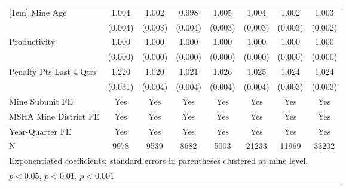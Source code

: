 {\begin{tabular}{l*{7}{c}}
[1em]
Mine Age                 &       1.004         &       1.002         &       0.998         &       1.005         &       1.004         &       1.002         &       1.003         \\
                         &     (0.004)         &     (0.003)         &     (0.004)         &     (0.003)         &     (0.003)         &     (0.003)         &     (0.002)         \\
[1em]
Productivity             &       1.000\sym{*}  &       1.000\sym{**} &       1.000\sym{*}  &       1.000\sym{*}  &       1.000\sym{***}&       1.000\sym{**} &       1.000\sym{***}\\
                         &     (0.000)         &     (0.000)         &     (0.000)         &     (0.000)         &     (0.000)         &     (0.000)         &     (0.000)         \\
[1em]
Penalty Pts Last 4 Qtrs  &       1.220\sym{***}&       1.020\sym{***}&       1.021\sym{***}&       1.026\sym{***}&       1.025\sym{***}&       1.024\sym{***}&       1.024\sym{***}\\
                         &     (0.031)         &     (0.004)         &     (0.004)         &     (0.004)         &     (0.004)         &     (0.003)         &     (0.003)         \\
[1em]
Mine Subunit FE          &         Yes         &         Yes         &         Yes         &         Yes         &         Yes         &         Yes         &         Yes         \\
[1em]
MSHA Mine District FE    &         Yes         &         Yes         &         Yes         &         Yes         &         Yes         &         Yes         &         Yes         \\
[1em]
Year-Quarter FE          &         Yes         &         Yes         &         Yes         &         Yes         &         Yes         &         Yes         &         Yes         \\
\hline
N                        &        9978         &        9539         &        8682         &        5003         &       21233         &       11969         &       33202         \\
\hline\hline
\multicolumn{8}{l}{\footnotesize Exponentiated coefficients; standard errors in parentheses clustered at mine level.}\\
\multicolumn{8}{l}{\footnotesize \sym{*} \(p<0.05\), \sym{**} \(p<0.01\), \sym{***} \(p<0.001\)}\\
\end{tabular}
}
